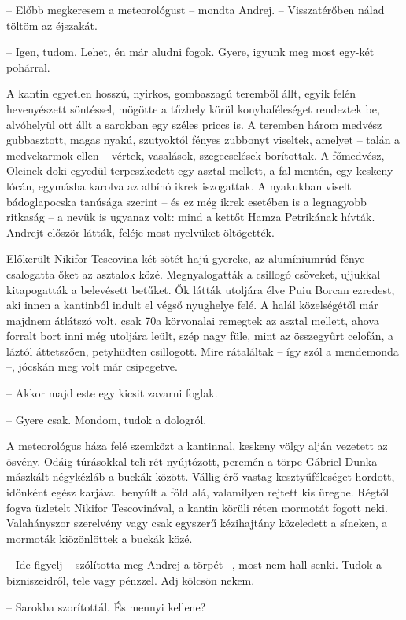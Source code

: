 \documentclass{IEEEtran}
\begin{document}
– Előbb megkeresem a meteorológust – mondta Andrej. – Visszatérőben nálad
töltöm az éjszakát.

– Igen, tudom. Lehet, én már aludni fogok. Gyere, igyunk meg most egy-két
pohárral.

A kantin egyetlen hosszú, nyirkos, gombaszagú teremből állt, egyik felén
hevenyészett söntéssel, mögötte a tűzhely körül konyhaféleséget rendeztek be,
alvóhelyül ott állt a sarokban egy széles priccs is. A teremben három medvész
gubbasztott, magas nyakú, szutyoktól fényes zubbonyt viseltek, amelyet – talán
a medvekarmok ellen – vértek, vasalások, szegecselések borítottak. A
főmedvész, Oleinek doki egyedül terpeszkedett egy asztal mellett, a fal
mentén, egy keskeny lócán, egymásba karolva az albínó ikrek iszogattak. A
nyakukban viselt bádoglapocska tanúsága szerint – és ez még ikrek esetében is
a legnagyobb ritkaság – a nevük is ugyanaz volt: mind a kettőt Hamza
Petrikának hívták. Andrejt először látták, feléje most nyelvüket öltögették.

Előkerült Nikifor Tescovina két sötét hajú gyereke, az alumíniumrúd fénye
csalogatta őket az asztalok közé. Megnyalogatták a csillogó csöveket, ujjukkal
kitapogatták a belevésett betűket. Ők látták utoljára élve Puiu Borcan
ezredest, aki innen a kantinból indult el végső nyughelye felé. A halál
közelségétől már majdnem átlátszó volt, csak 70a körvonalai remegtek az asztal
mellett, ahova forralt bort inni még utoljára leült, szép nagy füle, mint az
összegyűrt celofán, a láztól áttetszően, petyhüdten csillogott. Mire
rátaláltak – így szól a mendemonda –, jócskán meg volt már csipegetve.

– Akkor majd este egy kicsit zavarni foglak.

– Gyere csak. Mondom, tudok a dologról.

A meteorológus háza felé szemközt a kantinnal, keskeny völgy alján vezetett az
ösvény. Odáig túrásokkal teli rét nyújtózott, peremén a törpe Gábriel Dunka
mászkált négykézláb a buckák között. Vállig érő vastag kesztyűféleséget
hordott, időnként egész karjával benyúlt a föld alá, valamilyen rejtett kis
üregbe. Régtől fogva üzletelt Nikifor Tescovinával, a kantin körüli réten
mormotát fogott neki. Valahányszor szerelvény vagy csak egyszerű kézihajtány
közeledett a síneken, a mormoták kiözönlöttek a buckák közé.

– Ide figyelj – szólította meg Andrej a törpét –, most nem hall senki. Tudok a
bizniszeidről, tele vagy pénzzel. Adj kölcsön nekem.

– Sarokba szorítottál. És mennyi kellene?
\end{document}
